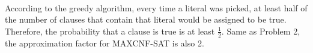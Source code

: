 \begin{problem}{3} ~\\
According to the greedy algorithm, every time a literal was picked, at least half of the number of clauses that contain that literal would be assigned to be true. Therefore, the probability that a clause is true is at least $\frac{1}{2}$. Same as Problem 2, the approximation factor for MAXCNF-SAT is also 2.
\end{problem}